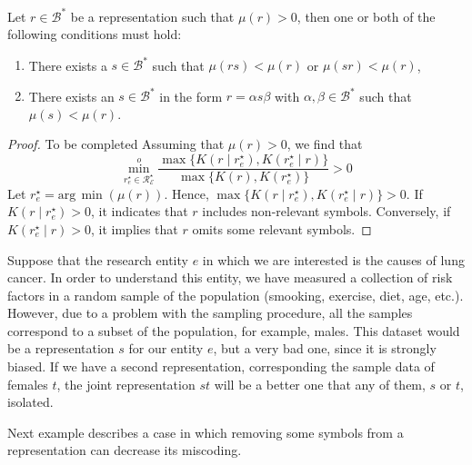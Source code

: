 \begin{theorem}
\label{th:reduce_miscoding}
Let $r \in \mathcal{B}^\ast$ be a representation such that $\mu(r) >0$, then one or both of the following conditions must hold:
\begin{enumerate}[label=(\roman*)]
\item There exists a $s \in \mathcal{B}^\ast$ such that $\mu(rs) < \mu(r)$ or $\mu(sr) < \mu(r)$,
\item There exists an $s \in \mathcal{B}^\ast$ in the form $r = \alpha s \beta$ with $\alpha, \beta \in \mathcal{B}^\ast$ such that $\mu(s) < \mu(r)$.
\end{enumerate}
\end{theorem}
\begin{proof}
{\color{red} To be completed}
Assuming that $\mu(r) >0$, we find that
\[
\overset{o}{ \underset{ r^\star_e \in \mathcal{R}^\star_\mathcal{E} } \min} \frac{ \max\{ K \left( r \mid r^\star_e \right), K \left( r^\star_e \mid r \right) \} } { \max\{ K \left( r \right), K \left( r^\star_e \right) \} } > 0
\]
Let $r^\star_e = \text{arg}\,\min \left( \mu(r) \right)$. Hence, $\max\{ K \left( r \mid r^\star_e \right), K \left( r^\star_e \mid r \right) \} > 0$. If $K \left( r \mid r^\star_e \right) > 0$, it indicates that $r$ includes non-relevant symbols. Conversely, if $K \left( r^\star_e \mid r \right) > 0$, it implies that $r$ omits some relevant symbols.
\end{proof}

\begin{example}
\label{ex:lung_cancer}
Suppose that the research entity $e$ in which we are interested is the causes of lung cancer. In order to understand this entity, we have measured a collection of risk factors in a random sample of the population (smooking, exercise, diet, age, etc.). However, due to a problem with the sampling procedure, all the samples correspond to a subset of the population, for example, males. This dataset would be a representation $s$ for our entity $e$, but a very bad one, since it is strongly biased. If we have a second representation, corresponding the sample data of females $t$, the joint representation $st$ will be a better one that any of them, $s$ or $t$, isolated.
\end{example}

Next example describes a case in which removing some symbols from a representation can decrease its miscoding.

